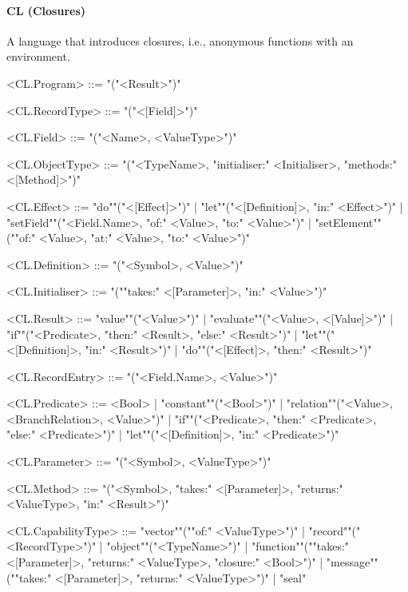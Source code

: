 \documentclass[main.tex]{subfiles}
\begin{document}
\paragraph{ CL (Closures) } A language that introduces closures, i.e., anonymous functions with an environment.
\begin{grammar}
	\footnotesize
				<CL.Program> ::=
							"("<Result>")"
				\par
				<CL.RecordType> ::=
							"("<[Field]>")"
				\par
				<CL.Field> ::=
							"("<Name>, <ValueType>")"
				\par
				<CL.ObjectType> ::=
							"("<TypeName>, "initialiser:" <Initialiser>, "methods:" <[Method]>")"
				\par
				<CL.Effect> ::=
						"do""("<[Effect]>")"
						| "let""("<[Definition]>, "in:" <Effect>")"
						| "setField""("<Field.Name>, "of:" <Value>, "to:" <Value>")"
						| "setElement""(""of:" <Value>, "at:" <Value>, "to:" <Value>")"
				\par
				<CL.Definition> ::=
							"("<Symbol>, <Value>")"
				\par
				<CL.Initialiser> ::=
							"(""takes:" <[Parameter]>, "in:" <Value>")"
				\par
				<CL.Result> ::=
						"value""("<Value>")"
						| "evaluate""("<Value>, <[Value]>")"
						| "if""("<Predicate>, "then:" <Result>, "else:" <Result>")"
						| "let""("<[Definition]>, "in:" <Result>")"
						| "do""("<[Effect]>, "then:" <Result>")"
				\par
				<CL.RecordEntry> ::=
							"("<Field.Name>, <Value>")"
				\par
				<CL.Predicate> ::=
						<Bool> |
						"constant""("<Bool>")"
						| "relation""("<Value>, <BranchRelation>, <Value>")"
						| "if""("<Predicate>, "then:" <Predicate>, "else:" <Predicate>")"
						| "let""("<[Definition]>, "in:" <Predicate>")"
				\par
				<CL.Parameter> ::=
							"("<Symbol>, <ValueType>")"
				\par
				<CL.Method> ::=
							"("<Symbol>, "takes:" <[Parameter]>, "returns:" <ValueType>, "in:" <Result>")"
				\par
				<CL.CapabilityType> ::=
						"vector""(""of:" <ValueType>")"
						| "record""("<RecordType>")"
						| "object""("<TypeName>")"
						| "function""(""takes:" <[Parameter]>, "returns:" <ValueType>, "closure:" <Bool>")"
						| "message""(""takes:" <[Parameter]>, "returns:" <ValueType>")"
						| "seal"
				\par

\end{grammar}
\end{document}
